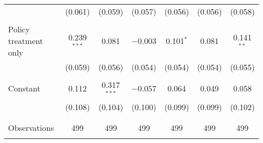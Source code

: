 \begin{tabular}{@{\extracolsep{5pt}}lcccccc}
  & (0.061) & (0.059) & (0.057) & (0.056) & (0.056) & (0.058) \\ 
  & & & & & & \\ 
 Policy treatment only & 0.239$^{***}$ & 0.081 & $-$0.003 & 0.101$^{*}$ & 0.081 & 0.141$^{**}$ \\ 
  & (0.059) & (0.056) & (0.054) & (0.054) & (0.054) & (0.055) \\ 
  & & & & & & \\ 
 Constant & 0.112 & 0.317$^{***}$ & $-$0.057 & 0.064 & 0.049 & 0.058 \\ 
  & (0.108) & (0.104) & (0.100) & (0.099) & (0.099) & (0.102) \\ 
  & & & & & & \\ 
\hline \\[-1.8ex] 

Observations & 499 & 499 & 499 & 499 & 499 & 499 \\ 
\hline 
\hline \\[-1.8ex] 
\end{tabular} 